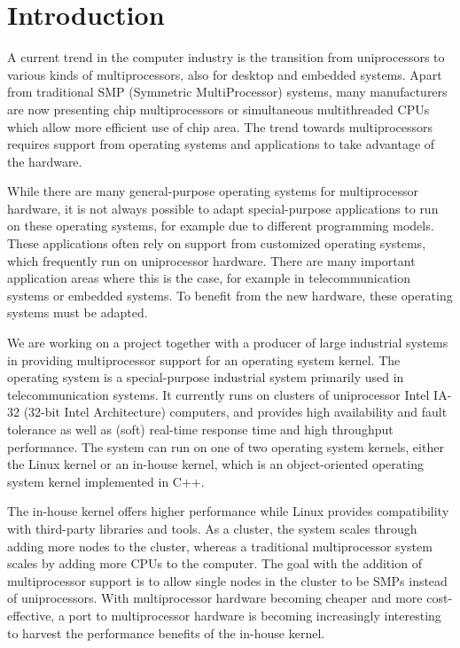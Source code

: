 \section{Introduction}

A current trend in the computer industry is the transition from uniprocessors
to various kinds of multiprocessors, also for desktop and embedded systems.
Apart from traditional SMP (Symmetric MultiProcessor) systems, many
manufacturers are now presenting chip multiprocessors or simultaneous
multithreaded CPUs~\cite{kahle99power4,marr02hyperthreading,sun05ultra4}
which allow more efficient use of chip area. The trend towards multiprocessors
requires support from operating systems and applications to take advantage of
the hardware.

While there are many general-purpose operating systems for multiprocessor
hardware, it is not always possible to adapt special-purpose applications to
run on these operating systems, for example due to different programming
models. These applications often rely on support from customized operating
systems, which frequently run on uniprocessor hardware. There are many
important application areas where this is the case, for example in
telecommunication systems or embedded systems. To benefit from the new
hardware, these operating systems must be adapted.

We are working on a project together with a producer of large industrial
systems in providing multiprocessor support for an operating system kernel.
The operating system is a special-purpose industrial system primarily used in
telecommunication systems.  It currently runs on clusters of uniprocessor
Intel IA-32 (32-bit Intel Architecture) computers, and provides high
availability and fault tolerance as well as (soft) real-time response time and
high throughput performance. The system can run on one of two operating system
kernels, either the Linux kernel or an in-house kernel, which is an
object-oriented operating system kernel implemented in C++.

The in-house kernel offers higher performance while Linux provides
compatibility with third-party libraries and tools. As a cluster, the system
scales through adding more nodes to the cluster, whereas a traditional
multiprocessor system scales by adding more CPUs to the computer. The goal
with the addition of multiprocessor support is to allow single nodes in the
cluster to be SMPs instead of uniprocessors. With multiprocessor hardware
becoming cheaper and more cost-effective, a port to multiprocessor hardware is
becoming increasingly interesting to harvest the performance benefits of the
in-house kernel.

